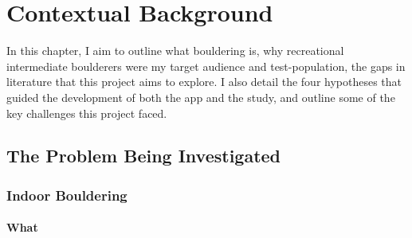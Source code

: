 \chapter{Contextual Background}
\label{chap:context}

%

In this chapter, I aim to outline what bouldering is, why recreational intermediate boulderers were my target audience and test-population, the gaps in literature that this project aims to explore.
I also detail the four hypotheses that guided the development of both the app and the study, and outline some of the key challenges this project faced.

\section{The Problem Being Investigated}
\subsection{Indoor Bouldering}
\subsubsection{What}

